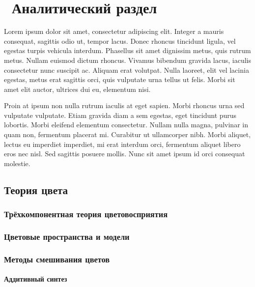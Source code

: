 \chapter{ Аналитический раздел}
\label{cha:analysis}
%
%
Lorem ipsum dolor sit amet, consectetur adipiscing elit. Integer a mauris consequat, sagittis odio ut, tempor lacus. Donec rhoncus tincidunt ligula, vel egestas turpis vehicula interdum. Phasellus sit amet dignissim metus, quis rutrum metus. Nullam euismod dictum rhoncus. Vivamus bibendum gravida lacus, iaculis consectetur nunc suscipit ac. Aliquam erat volutpat. Nulla laoreet, elit vel lacinia egestas, metus erat sagittis orci, quis vulputate urna tellus ut felis. Morbi sit amet elit auctor, ultrices dui eu, elementum nisi.

Proin at ipsum non nulla rutrum iaculis at eget sapien. Morbi rhoncus urna sed vulputate vulputate. Etiam gravida diam a sem egestas, eget tincidunt purus lobortis. Morbi eleifend elementum consectetur. Nullam nulla magna, pulvinar in quam non, fermentum placerat mi. Curabitur ut ullamcorper nibh. Morbi aliquet, lectus eu imperdiet imperdiet, mi erat interdum orci, fermentum aliquet libero eros nec nisl. Sed sagittis posuere mollis. Nunc sit amet ipsum id orci consequat molestie.




\section{Теория цвета}
\subsection{Трёхкомпонентная теория цветовосприятия}
\subsection {Цветовые пространства и модели}
\subsection{Методы смешивания цветов}
\subsubsection{Аддитивный синтез}
